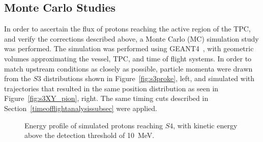 \subsection{Monte Carlo Studies}
In order to ascertain the flux of protons reaching the active region of the TPC, and verify the corrections described above, a Monte Carlo (MC) simulation study was performed.
The simulation was performed using GEANT4~\cite{brun1993geant}, with geometric volumes approximating the vessel, TPC, and time of flight systems.
In order to match upstream conditions as closely as possible, particle momenta were drawn from the $\mathit{S3}$ distributions shown in Figure~\ref{fig:s3proke}, left, and simulated with trajectories that resulted in the same position distribution as seen in Figure~\ref{fig:s3XY_pion}, right.
The same timing cuts described in Section~\ref{timeofflightanalysissubsec} were applied.

%      

\begin{figure}[ht]
  \centering
     \begin{adjustbox}{max totalsize={\textwidth}{.35\textheight}, center}
      
    \end{adjustbox}
    \caption{Energy profile of simulated protons reaching $\mathit{S4}$, with kinetic energy above the detection threshold of 10~MeV.}
    \label{fig:MCS4}
\end{figure}

